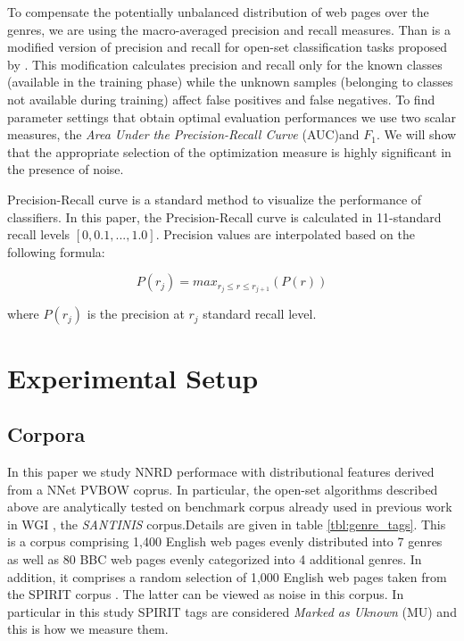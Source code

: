 \documentclass[runningheads]{llncs}
\begin{document}
To compensate the potentially unbalanced distribution of web pages over the genres, we are using the macro-averaged precision and recall measures. Than is a modified version of precision and recall for open-set classification tasks proposed by \cite{mendesjunior2016}. This modification calculates precision and recall only for the known classes (available in the training phase) while the unknown samples (belonging to classes not available during training) affect false positives and false negatives. To find parameter settings that obtain optimal evaluation performances we use two scalar measures, the \textit{Area Under the Precision-Recall Curve} (AUC)and $F_{1}$. We will show that the appropriate selection of the optimization measure is highly significant in the presence of noise.

Precision-Recall curve is a standard method to visualize the performance of classifiers. In this paper, the Precision-Recall curve is calculated in 11-standard recall levels $[0,0.1,...,1.0]$. Precision values are interpolated based on the following formula:

\begin{equation}
	P(r_j)=max_{r_j \leqslant r \leqslant r_{j+1}}(P(r))
\end{equation}

\noindent
where $P(r_j)$ is the precision at $r_j$ standard recall level.

\section{Experimental Setup}\label{sec:experimental_setup}
\subsection{Corpora}\label{sec:corpora}
In this paper we study NNRD performace with distributional features derived from a NNet PVBOW coprus. In particular, the open-set algorithms described above are analytically tested on benchmark corpus already used in previous work in WGI \citep{meyer2004genre,santini2007automatic,kanaris2009learning,pritsos2018open}, the \textit{SANTINIS} \cite{mehler2010genres_on_web} corpus.Details are given in table \ref{tbl:genre_tags}. This is a corpus comprising 1,400 English web pages evenly distributed into 7 genres as well as 80 BBC web pages evenly categorized into 4 additional genres. In addition, it comprises a random selection of 1,000 English web pages taken from the SPIRIT corpus \cite{joho2004spirit}. The latter can be viewed as noise in this corpus. In particular in this study SPIRIT tags are considered \textit{Marked as Uknown} (MU) and this is how we measure them.
\end{document}
